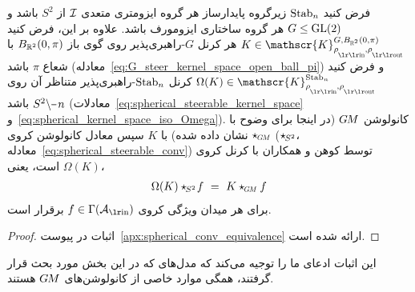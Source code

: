 \begin{thm}
	\label{thm:spherical_conv_GM_conv}
	فرض کنید $\operatorname{Stab}_{n}$ زیرگروه پایدارساز هر گروه ایزومتری متعدی $\mathcal{I}$ از $S^2$ باشد و $G \leq \operatorname{GL}(2)$ هر گروه ساختاری ایزومورف باشد.
	علاوه بر این، فرض کنید $K \in \mathscr{K}^{G,B_{\R^2}(0,\pi)}_{\rhoin\mkern-1mu,\rhoout}$ هر کرنل $G$-راهبری‌پذیر روی گوی باز $B_{\mathbb{R}^2}(0,\pi)$ با شعاع $\pi$ باشد (معادله~\eqref{eq:G_steer_kernel_space_open_ball_pi})
	و فرض کنید $\Omega(K) \in \mathscr{K}^{\Stab{n}}_{\rhoin\mkern-1mu,\rhoout}$ کرنل $\operatorname{Stab}_{n}$-راهبری‌پذیر متناظر آن روی $S^2\backslash \mkern-1mu\minus\mkern1mu n$ باشد (معادلات~\eqref{eq:spherical_steerable_kernel_space} و~\eqref{eq:spherical_kernel_space_iso_Omega}).
	کانولوشن $G\mkern-1.4muM$ (در اینجا برای وضوح با $\star_{\mkern-1mu\scalebox{.64}{$\GM$}}$ نشان داده شده) با $K$ سپس معادل کانولوشن کروی ($\star_{\mkern-2mu S^2}$، معادله~\eqref{eq:spherical_steerable_conv}) توسط کوهن و همکاران\cite{Cohen2018-intertwiners} با کرنل کروی $\Omega(K)$ است، یعنی،
	\begin{align}
		\Omega(K) \star_{\mkern-2mu S^2}\! f\ =\ K \star_{\mkern-1mu\scalebox{.64}{$\GM$}} f
	\end{align}
	برای هر میدان ویژگی کروی $f \in \Gamma(\Ain)$ برقرار است.
\end{thm}
\begin{proof}
	اثبات در پیوست~\ref{apx:spherical_conv_equivalence} ارائه شده است.
\end{proof}
این اثبات ادعای ما را توجیه می‌کند که مدل‌های \cite{Cohen2018-S2CNN,esteves2018zonalSpherical,esteves2020spinweighted,kondor2018ClebschGordan} که در این بخش مورد بحث قرار گرفتند، همگی موارد خاصی از کانولوشن‌های $G\mkern-1.4muM$ هستند.